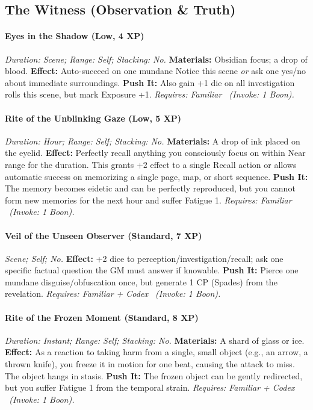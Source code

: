 \documentclass[12pt,twoside]{book}
\begin{document}
\subsection{The Witness (Observation \& Truth)}
\paragraph{Eyes in the Shadow (Low, 4 XP)} \emph{Duration: Scene; Range: Self; Stacking: No.}
\textbf{Materials:} Obsidian focus; a drop of blood.
\textbf{Effect:} Auto-succeed on one mundane Notice this scene \emph{or} ask one yes/no about immediate surroundings.
\textbf{Push It:} Also gain +1 die on all investigation rolls this scene, but mark Exposure +1.
\emph{Requires: Familiar \ (\textit{Invoke:} 1 Boon).}
\paragraph{Rite of the Unblinking Gaze (Low, 5 XP)} \emph{Duration: Hour; Range: Self; Stacking: No.}
\textbf{Materials:} A drop of ink placed on the eyelid.
\textbf{Effect:} Perfectly recall anything you consciously focus on within Near range for the duration. This grants +2 effect to a single Recall action or allows automatic success on memorizing a single page, map, or short sequence.
\textbf{Push It:} The memory becomes eidetic and can be perfectly reproduced, but you cannot form new memories for the next hour and suffer Fatigue 1.
\emph{Requires: Familiar \ (\textit{Invoke:} 1 Boon).}
\paragraph{Veil of the Unseen Observer (Standard, 7 XP)} \emph{Scene; Self; No.}
\textbf{Effect:} +2 dice to perception/investigation/recall; ask one specific factual question the GM must answer if knowable.
\textbf{Push It:} Pierce one mundane disguise/obfuscation once, but generate 1 CP (Spades) from the revelation.
\emph{Requires: Familiar + Codex \ (\textit{Invoke:} 1 Boon).}
\paragraph{Rite of the Frozen Moment (Standard, 8 XP)} \emph{Duration: Instant; Range: Self; Stacking: No.}
\textbf{Materials:} A shard of glass or ice.
\textbf{Effect:} As a reaction to taking harm from a single, small object (e.g., an arrow, a thrown knife), you freeze it in motion for one beat, causing the attack to miss. The object hangs in stasis.
\textbf{Push It:} The frozen object can be gently redirected, but you suffer Fatigue 1 from the temporal strain.
\emph{Requires: Familiar + Codex \ (\textit{Invoke:} 1 Boon).}
\end{document}
